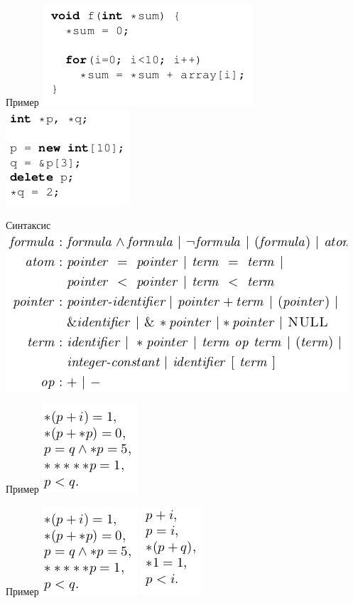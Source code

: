 \documentclass{beamer}
\begin{document}
\begin{frame}{Пример}
\includegraphics[scale=0.5]{ex1.png}
\includegraphics[scale=0.5]{ex2.png}
\end{frame}

\begin{frame}{Синтаксис}
\includegraphics[scale=0.5]{syntax.png}
\end{frame}

\begin{frame}{Пример}
\includegraphics[scale=0.5]{perm.png}
\end{frame}

\begin{frame}{Пример}
\includegraphics[scale=0.5]{perm.png}
\includegraphics[scale=0.5]{not_perm.png}
\end{frame}
\end{document}
